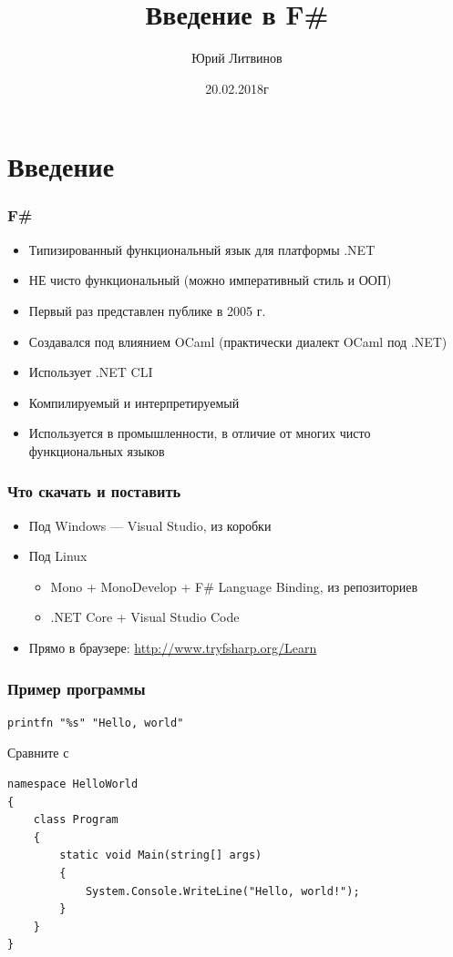 \documentclass[xetex,mathserif,serif]{beamer}
\title{Введение в F\#}
\author{Юрий Литвинов}
\date{20.02.2018г}
\begin{document}
	
	\frame{\titlepage}
	
	\section{Введение}
	
	\begin{frame}
		\frametitle{F\#}
		\begin{itemize}
			\item Типизированный функциональный язык для платформы .NET
			\item НЕ чисто функциональный (можно императивный стиль и ООП)
			\item Первый раз представлен публике в 2005 г.
			\item Создавался под влиянием OCaml (практически диалект OCaml под .NET)
			\item Использует .NET CLI
			\item Компилируемый и интерпретируемый
			\item Используется в промышленности, в отличие от многих чисто функциональных языков
		\end{itemize}
	\end{frame}

	\begin{frame}
		\frametitle{Что скачать и поставить}
		\begin{itemize}
			\item Под Windows --- Visual Studio, из коробки
			\item Под Linux
			\begin{itemize}
				\item Mono + MonoDevelop + F\# Language Binding, из репозиториев
				\item .NET Core + Visual Studio Code
			\end{itemize}
			\item Прямо в браузере: \url{http://www.tryfsharp.org/Learn}
		\end{itemize}
	\end{frame}
	
	\begin{frame}[fragile]
		\frametitle{Пример программы}
		\begin{verbatim}
printfn "%s" "Hello, world"
		\end{verbatim}
		Сравните с
		\begin{verbatim}
namespace HelloWorld
{
    class Program
    {
        static void Main(string[] args)
        {
            System.Console.WriteLine("Hello, world!");
        }
    }
}
		\end{verbatim}
	\end{frame}
\end{document}
